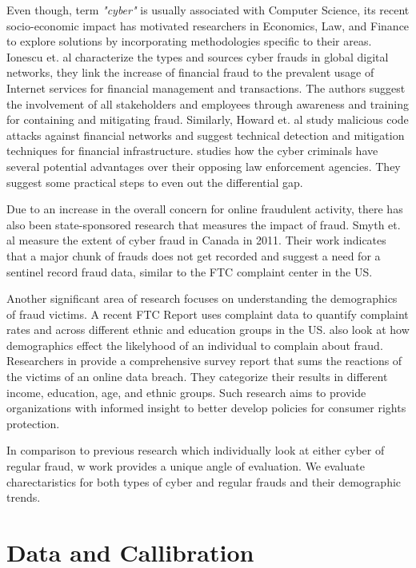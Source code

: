 \documentclass[conference]{IEEEtran}
\begin{document}
Even though, term \emph{"cyber"} is usually associated with Computer Science, its recent socio-economic impact has motivated researchers in Economics, Law, and Finance to explore solutions by incorporating methodologies specific to their areas. Ionescu et. al \cite{fraudfinance} characterize the types and sources cyber frauds in global digital networks, they link the increase of financial fraud to the prevalent usage of Internet services for financial management and transactions. The authors suggest the involvement of all stakeholders and employees through awareness and training for containing and mitigating fraud. Similarly, Howard et. al \cite{cybertrends} study malicious code attacks against financial networks and suggest technical detection and mitigation techniques for financial infrastructure. \cite{playingfield} studies how the cyber criminals have several potential advantages over their opposing law enforcement agencies. They suggest some practical steps to even out the differential gap.

Due to an increase in the overall concern for online fraudulent activity, there has also been state-sponsored research that measures the impact of fraud. Smyth et. al \cite{fraudcanada} measure the extent of cyber fraud in Canada in 2011. Their work indicates that a major chunk of frauds does not get recorded and suggest a need for a sentinel record fraud data, similar to the FTC complaint center in the US.

Another significant area of research focuses on understanding the demographics of fraud victims. A recent FTC Report \cite{ftccomplaints} uses complaint data to quantify complaint rates and across different ethnic and education groups in the US. \cite{consurmeraffairs} also look at how demographics effect the likelyhood of an individual to complain about fraud. Researchers in \cite{databreach} provide a comprehensive survey report that sums the reactions of the victims of an online data breach. They categorize their results in different income, education, age, and ethnic groups. Such research aims to provide organizations with informed insight to better develop policies for consumer rights protection.

In comparison to previous research which individually look at either cyber of regular fraud, w work provides a unique angle of evaluation. We evaluate charectaristics for both types of cyber and regular frauds and their demographic trends.

\section{Data and Callibration} \label{data-cal}
\end{document}
